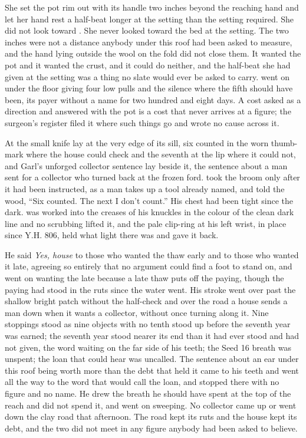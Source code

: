 She set the pot rim out with its handle two inches beyond the reaching hand and let her hand rest a half-beat longer at the setting than the setting required. She did not look toward . She never looked toward the bed at the setting. The two inches were not a distance anybody under this roof had been asked to measure, and the hand lying outside the wool on the fold did not close them. It wanted the pot and it wanted the crust, and it could do neither, and the half-beat she had given at the setting was a thing no slate would ever be asked to carry.  went on under the floor giving four low pulls and the silence where the fifth should have been, its payer without a name for two hundred and eight days. A cost asked as a direction and answered with the pot is a cost that never arrives at a figure; the surgeon's register filed it where such things go and wrote no cause across it.

\scenebreak

At  the small knife lay at the very edge of its sill, six counted in the worn thumb-mark where the house could check and the seventh at the lip where it could not, and Garl's unforged collector sentence lay beside it, the sentence about a man sent for a collector who turned back at the frozen ford.  took the broom only after it had been instructed, as a man takes up a tool already named, and told the wood, “Six counted. The next I don't count.” His chest had been tight since the dark.  was worked into the creases of his knuckles in the colour of the clean dark line and no scrubbing lifted it, and the pale clip-ring at his left wrist, in place since Y.H. 806, held what light there was and gave it back.

He said \emph{Yes, house} to those who wanted the thaw early and to those who wanted it late, agreeing so entirely that no argument could find a foot to stand on, and went on wanting the late because a late thaw puts off the paying, though the paying had stood in the ruts since the water went. His stroke went over  past the shallow bright patch without the half-check and over the road a house sends a man down when it wants a collector, without once turning along it. Nine stoppings stood as nine objects with no tenth stood up before the seventh year was earned; the seventh year stood nearer its end than it had ever stood and had not given, the word waiting on the far side of his teeth; the Seed 16 breath was unspent; the loan that could hear was uncalled. The sentence about an ear under this roof being worth more than the debt that held it came to his teeth and went all the way to the word that would call the loan, and stopped there with no figure and no name. He drew the breath he should have spent at the top of the reach and did not spend it, and went on sweeping. No collector came up or went down the clay road that afternoon. The road kept its ruts and the house kept its debt, and the two did not meet in any figure anybody had been asked to believe.


